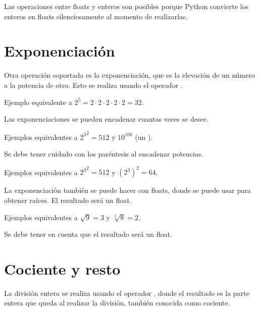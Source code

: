 
Las operaciones entre floats y enteros son posibles porque Python convierte los enteros en floats silenciosamente al momento de realizarlas.

\section{Exponenciación}

Otra operación soportada es la exponenciación, que es la elevación de un número a la potencia de otro.
Esto se realiza usando el operador \ttt{**}.
\medskip

Ejemplo equivalente a $2 ^ 5 = 2\cdot 2\cdot 2\cdot 2\cdot 2 = 32$.


Las exponenciaciones se pueden encadenar cuantas veces se desee.
\medskip

Ejemplos equivalentes a ${2 ^ 3} ^ 2 = 512$ y $10 ^ {100}$ (un ).


Se debe tener cuidado con los paréntesis al encadenar potencias.
\medskip

Ejemplos equivalentes a ${2 ^ 3} ^ 2 = 512$ y $(2 ^ 3) ^ 2 = 64$.


La exponenciación también se puede hacer con floats, donde se puede usar para obtener raíces.
El resultado será un float.
\medskip

Ejemplos equivalentes a $\sqrt{9} = 3$ y $\sqrt[3]{8} = 2$.


Se debe tener en cuenta que el resultado será un float.

\section{Cociente y resto}


La división entera se realiza usando el operador \ttt{//}, donde el resultado es la parte entera que queda al realizar la división, también conocida como cociente.
\medskip

